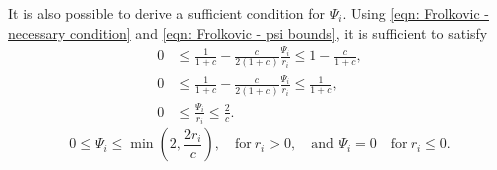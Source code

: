 \documentclass[../thesis.tex]{subfiles}
\begin{document}
\begin{remark}
It is also possible to derive a sufficient condition for \(\Psi_{i}\). Using \eqref{eqn: Frolkovic - necessary condition} and \eqref{eqn: Frolkovic - psi bounds}, it is sufficient to satisfy
\begin{equation}
    \begin{split}
        0
        &\leq
        \frac{1}{1+c}
        -\frac{c}{2(1+c)}
        \frac{\Psi_{i}}{r_{i}}
        \leq
        1 - \frac{c}{1+c},
        \\
        0
        &\leq
        \frac{1}{1+c}
        -\frac{c}{2(1+c)}
        \frac{\Psi_{i}}{r_{i}}
        \leq
        \frac{1}{1+c},
        \\
        0
        &\leq
        \frac{\Psi_{i}}{r_{i}}
        \leq
        \frac{2}{c}.
    \end{split}
\end{equation}
\begin{equation}
    0
    \leq
    \Psi_{i}
    \leq
    \min\left( 2, \frac{2r_{i}}{c} \right),
    \quad
    \text{for}\ r_{i} > 0,
    \quad
    \text{and } \Psi_{i} = 0
    \quad
    \text{for}\ r_{i} \leq 0.
\end{equation}
\end{remark}
\end{document}
